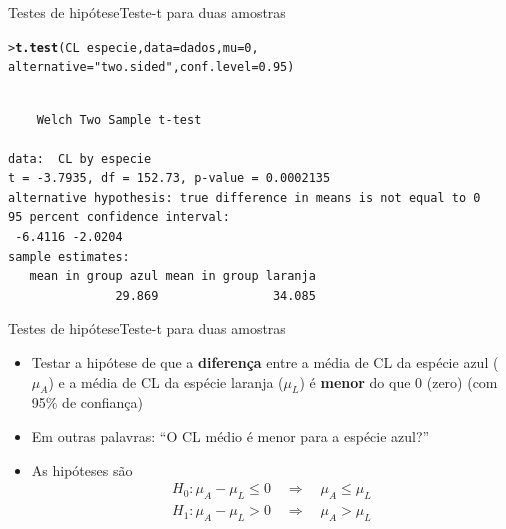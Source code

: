 \documentclass[10pt]{beamer}\usepackage[]{graphicx}\usepackage[]{color}
\makeatletter
\newcommand{\hlnum}[1]{\textcolor[rgb]{0.686,0.059,0.569}{#1}}%
\newcommand{\hlstr}[1]{\textcolor[rgb]{0.282,0.239,0.545}{#1}}%
\newcommand{\hlopt}[1]{\textcolor[rgb]{0,0,0}{#1}}%
\newcommand{\hlstd}[1]{\textcolor[rgb]{0.345,0.345,0.345}{#1}}%
\newcommand{\hlkwc}[1]{\textcolor[rgb]{0.333,0.667,0.333}{#1}}%
\newcommand{\hlkwd}[1]{\textcolor[rgb]{0.282,0.239,0.545}{\textbf{#1}}}%
\newenvironment{kframe}{%
 \def\at@end@of@kframe{}%
 \ifinner\ifhmode%
  \def\at@end@of@kframe{\end{minipage}}%
  \begin{minipage}{\columnwidth}%
 \fi\fi%
 \def\FrameCommand##1{\hskip\@totalleftmargin \hskip-\fboxsep
 \colorbox{shadecolor}{##1}\hskip-\fboxsep
     \hskip-\linewidth \hskip-\@totalleftmargin \hskip\columnwidth}%
 \MakeFramed {\advance\hsize-\width
   \@totalleftmargin\z@ \linewidth\hsize
   \@setminipage}}%
 {\par\unskip\endMakeFramed%
 \at@end@of@kframe}
\newenvironment{knitrout}{}{} %
\makeatother
\begin{document}
\begin{frame}[fragile=singleslide]{Testes de hipótese}{Teste-t para duas amostras}
\begin{knitrout}\small
{}\color{fgcolor}\begin{kframe}
\begin{alltt}
\hlstd{> }\hlkwd{t.test}\hlstd{(CL} \hlopt{~} \hlstd{especie,} \hlkwc{data} \hlstd{= dados,} \hlkwc{mu} \hlstd{=} \hlnum{0}\hlstd{,}
\hlstd{  }       \hlkwc{alternative} \hlstd{=} \hlstr{"two.sided"}\hlstd{,} \hlkwc{conf.level} \hlstd{=} \hlnum{0.95}\hlstd{)}
\end{alltt}
\begin{verbatim}

	Welch Two Sample t-test

data:  CL by especie
t = -3.7935, df = 152.73, p-value = 0.0002135
alternative hypothesis: true difference in means is not equal to 0
95 percent confidence interval:
 -6.4116 -2.0204
sample estimates:
   mean in group azul mean in group laranja 
               29.869                34.085 
\end{verbatim}
\end{kframe}
\end{knitrout}

\end{frame}

\begin{frame}[fragile=singleslide]{Testes de hipótese}{Teste-t para duas amostras}
  \begin{itemize}
  \item Testar a hipótese de que a \textbf{diferença} entre a média de
    CL da espécie azul ($\mu_A$) e a média de CL da espécie laranja
    ($\mu_L$) é \textbf{menor} do que 0 (zero) (com 95\% de confiança)
  \item Em outras palavras: ``O CL médio é menor para a espécie azul?''
  \item As hipóteses são
    \begin{align*}
      H_0: \mu_A - \mu_L \leq 0 \quad \Rightarrow \quad \mu_A \leq \mu_L \\
      H_1: \mu_A - \mu_L > 0 \quad \Rightarrow \quad \mu_A > \mu_L
    \end{align*}
  \end{itemize}
\end{frame}
\end{document}

